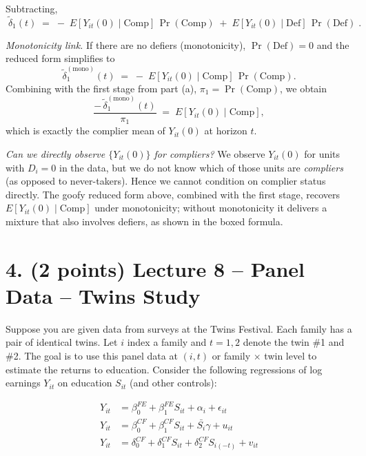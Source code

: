 \documentclass[12pt]{article}
\begin{document}
\begin{enumerate}[label=\textbf{(\alph*)}, leftmargin=1.5em]
    Subtracting,
    \[
    \boxed{\;\tilde\delta_1(t)\;=\;-\;E[Y_{it}(0)\mid \text{Comp}]\,\Pr(\text{Comp})
    \;+\;E[Y_{it}(0)\mid \text{Def}]\,\Pr(\text{Def})\; }.
    \]

    \textit{Monotonicity link.} 
    If there are no defiers (monotonicity), $\Pr(\text{Def})=0$ and the reduced form simplifies to
    \[
    \tilde\delta_1^{(\text{mono})}(t)\;=\;-\;E[Y_{it}(0)\mid \text{Comp}]\,\Pr(\text{Comp}).
    \]
    Combining with the first stage from part (a), $\pi_1=\Pr(\text{Comp})$, we obtain
    \[
    \frac{-\,\tilde\delta_1^{(\text{mono})}(t)}{\pi_1}\;=\;E[Y_{it}(0)\mid \text{Comp}],
    \]
    which is exactly the complier mean of $Y_{it}(0)$ at horizon $t$.

  \textit{Can we directly observe $\{Y_{it}(0)\}$ for compliers?} 
    We observe $Y_{it}(0)$ for units with $D_i=0$ in the data, but we do not know which of those units are \emph{compliers} (as opposed to never-takers). Hence we cannot condition on complier status directly. The goofy reduced form above, combined with the first stage, recovers $E[Y_{it}(0)\mid\text{Comp}]$ under monotonicity; without monotonicity it delivers a mixture that also involves defiers, as shown in the boxed formula.

\end{enumerate}

\newpage

\section*{4. (2 points) Lecture 8 -- Panel Data -- Twins Study}
Suppose you are given data from surveys at the Twins Festival. Each family has a pair of identical twins. Let $i$ index a family and $t=1,2$ denote the twin \#1 and \#2. The goal is to use this panel data at $(i,t)$ or family $\times$ twin level to estimate the returns to education. Consider the following regressions of log earnings $Y_{it}$ on education $S_{it}$ (and other controls):

\begin{align}
Y_{it} &= \beta_0^{FE} + \beta_1^{FE} S_{it} + \alpha_i + \epsilon_{it} \tag{1}\\
Y_{it} &= \beta_0^{CF} + \beta_1^{CF} S_{it} + \bar{S_i}\gamma + u_{it} \tag{2}\\
Y_{it} &= \delta_0^{CF} + \delta_1^{CF} S_{it} + \delta_2^{CF} S_{i(-t)} + v_{it} \tag{3}
\end{align}
\end{document}
